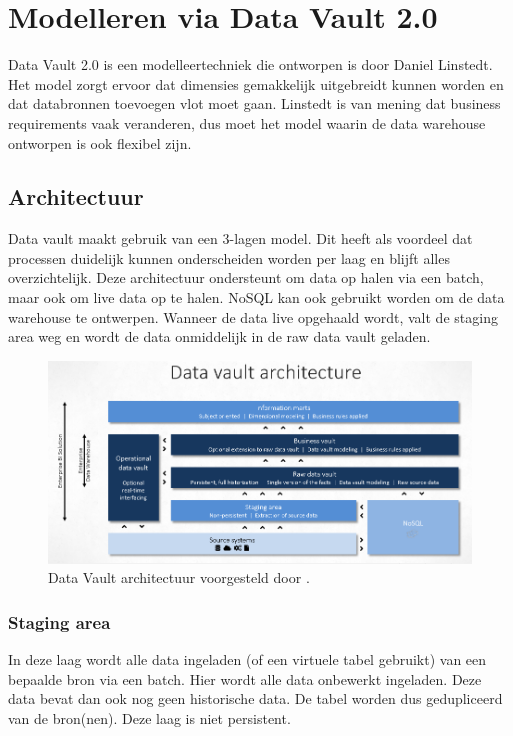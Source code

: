 \section{Modelleren via Data Vault 2.0}
Data Vault 2.0 is een modelleertechniek die ontworpen is door Daniel Linstedt. Het model zorgt ervoor dat dimensies gemakkelijk uitgebreidt kunnen worden en dat databronnen toevoegen vlot moet gaan. Linstedt is van mening dat business requirements vaak veranderen, dus moet het model waarin de data warehouse ontworpen is ook flexibel zijn. 
~\autocite{Linstedt2016}
\subsection{Architectuur}
Data vault maakt gebruik van een 3-lagen model. Dit heeft als voordeel dat processen duidelijk kunnen onderscheiden worden per laag en blijft alles overzichtelijk. Deze architectuur ondersteunt om data op halen via een batch, maar ook om live data op te halen. NoSQL kan ook gebruikt worden om de data warehouse te ontwerpen. Wanneer de data live opgehaald wordt, valt de staging area weg en wordt de data onmiddelijk in de raw data vault geladen.  ~\autocite{Linstedt2016}


\begin{figure}[h]
	\includegraphics[scale=0.63]{../images/DVArchitectuur.png}
	\caption{Data Vault architectuur voorgesteld door \textcite{Stroobants2018}.}
	\label{fig:dvarch}
\end{figure}

\subsubsection{Staging area}
In deze laag wordt alle data ingeladen (of een virtuele tabel gebruikt) van een bepaalde bron via een batch. Hier wordt alle data onbewerkt ingeladen. Deze data bevat dan ook nog geen historische data. De tabel worden dus gedupliceerd van de bron(nen). Deze laag is niet persistent.

